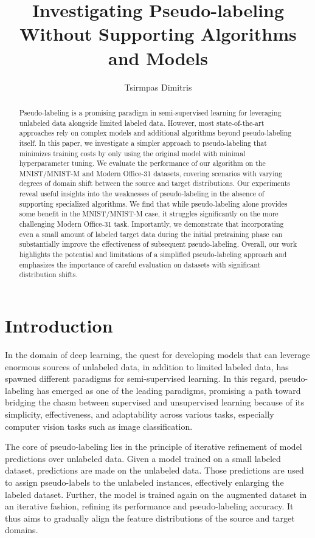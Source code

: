 \documentclass[12pt, a4paper]{article}
\title{\Huge Investigating Pseudo-labeling Without Supporting Algorithms and Models}
\author{\LARGE Tsirmpas Dimitris}
\begin{document}
	\maketitle
	\begin{abstract}
	
		Pseudo-labeling is a promising paradigm in semi-supervised learning for leveraging unlabeled data alongside limited labeled data. However, most state-of-the-art approaches rely on complex models and additional algorithms beyond pseudo-labeling itself. In this paper, we investigate a simpler approach to pseudo-labeling that minimizes training costs by only using the original model with minimal hyperparameter tuning. We evaluate the performance of our algorithm on the MNIST/MNIST-M and Modern Office-31 datasets, covering scenarios with varying degrees of domain shift between the source and target distributions. Our experiments reveal useful insights into the weaknesses of pseudo-labeling in the absence of supporting specialized algorithms. We find that while pseudo-labeling alone provides some benefit in the MNIST/MNIST-M case, it struggles significantly on the more challenging Modern Office-31 task. Importantly, we demonstrate that incorporating even a small amount of labeled target data during the initial pretraining phase can substantially improve the effectiveness of subsequent pseudo-labeling. Overall, our work highlights the potential and limitations of a simplified pseudo-labeling approach and emphasizes the importance of careful evaluation on datasets with significant distribution shifts.
	\end{abstract}
	
	
	\section{Introduction}
	
	In the domain of deep learning, the quest for developing models that can leverage enormous sources of unlabeled data, in addition to limited labeled data, has spawned different paradigms for semi-supervised learning. In this regard, pseudo-labeling has emerged as one of the leading paradigms, promising a path toward bridging the chasm between supervised and unsupervised learning because of its simplicity, effectiveness, and adaptability across various tasks, especially computer vision tasks such as image classification. 
	
	The core of pseudo-labeling lies in the principle of iterative refinement of model predictions over unlabeled data. Given a model trained on a small labeled dataset, predictions are made on the unlabeled data. Those predictions are used to assign pseudo-labels to the unlabeled instances, effectively enlarging the labeled dataset. Further, the model is trained again on the augmented dataset in an iterative fashion, refining its performance and pseudo-labeling accuracy. It thus aims to gradually align the feature distributions of the source and target domains.
	
\end{document}
